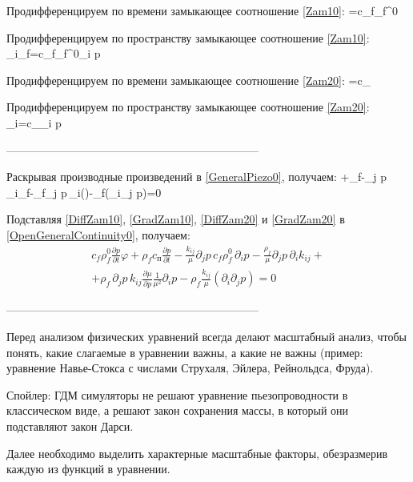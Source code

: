 Продифференцируем по времени замыкающее соотношение \eqref{Zam10}:
\beq\label{DiffZam10}
=c_f\rho_f^0
\eeq

Продифференцируем по пространству замыкающее соотношение \eqref{Zam10}:
\beq\label{GradZam10}
\partial_i\rho_f=c_f\rho_f^0\partial_i p
\eeq

Продифференцируем по времени замыкающее соотношение \eqref{Zam20}:
\beq\label{DiffZam20}
=c_
\eeq

Продифференцируем по пространству замыкающее соотношение \eqref{Zam20}:
\beq\label{GradZam20}
\partial_i\varphi=c_\partial_i p
\eeq

--------------------------------------------------------------------

Раскрывая производные произведений в \eqref{GeneralPiezo0}, получаем:
\beq\label{OpenGeneralContinuity0}
\varphi+\rho_f-\partial_j p\,\partial_i\rho_f-\rho_f\partial_j p\,\partial_i\!\left(\right)-\rho_f\left(\partial_i\partial_j p\right)=0
\eeq

Подставляя \eqref{DiffZam10}, \eqref{GradZam10}, \eqref{DiffZam20} и \eqref{GradZam20} в \eqref{OpenGeneralContinuity0}, получаем:
\begin{multline}\label{Expanded0}
c_f\rho_f^0\frac{\partial p}{\partial t}\varphi+\rho_f c_\text{п}\frac{\partial p}{\partial t}-\frac{k_{ij}}{\mu}\partial_j p\,c_f\rho_f^0\,\partial_i p-\frac{\rho_f}{\mu}\partial_j p\,\partial_i k_{ij}+\\+\rho_f\,\partial_j p\,k_{ij}\frac{\partial\mu}{\partial p}\frac{1}{\mu^2}\partial_i p-\rho_f\frac{k_{ij}}{\mu}\left(\partial_i\partial_j p\right)=0
\end{multline}

--------------------------------------------------------------------

Перед анализом физических уравнений всегда делают масштабный анализ, чтобы понять, какие слагаемые в уравнении важны, а какие не важны (пример: уравнение Навье-Стокса с числами Струхаля, Эйлера, Рейнольдса, Фруда).

Спойлер: ГДМ симуляторы не решают уравнение пьезопроводности в классическом виде, а решают закон сохранения массы, в который они подставляют закон Дарси.

Далее необходимо выделить характерные масштабные факторы, обезразмерив каждую из функций в уравнении.


